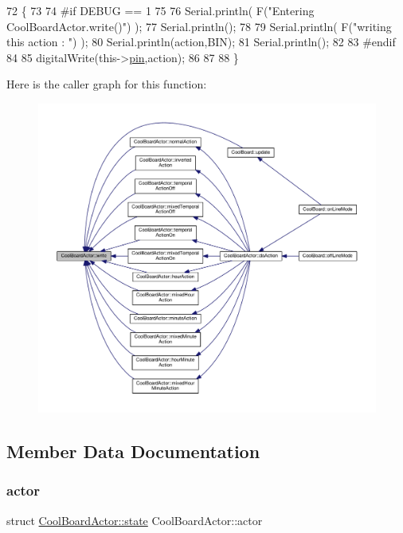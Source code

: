\begin{DoxyCode}
72 \{
73 
74 \textcolor{preprocessor}{#if DEBUG == 1}
75 
76     Serial.println( F(\textcolor{stringliteral}{"Entering CoolBoardActor.write()"}) );
77     Serial.println();
78 
79     Serial.println( F(\textcolor{stringliteral}{"writing this action : "}) );
80     Serial.println(action,BIN);
81     Serial.println();
82 
83 \textcolor{preprocessor}{#endif }
84     
85     digitalWrite(this->\hyperlink{class_cool_board_actor_a8b5c0b41fe6033b68d9e1ed00bc2e122}{pin},action);
86     
87 
88 \}
\end{DoxyCode}
Here is the caller graph for this function\+:\nopagebreak
\begin{figure}[H]
\begin{center}
\leavevmode
\includegraphics[width=350pt]{dc/d69/class_cool_board_actor_a958786ff01ea1056ee72c72d439f86da_icgraph}
\end{center}
\end{figure}


\subsection{Member Data Documentation}
\mbox{\label{class_cool_board_actor_a8f190db9f7a39fddbcef7f152da970e9}} 
\subsubsection{\texorpdfstring{actor}{actor}}
{\footnotesize\ttfamily struct \hyperlink{struct_cool_board_actor_1_1state}{Cool\+Board\+Actor\+::state} Cool\+Board\+Actor\+::actor\hspace{0.3cm}{\ttfamily [private]}}

